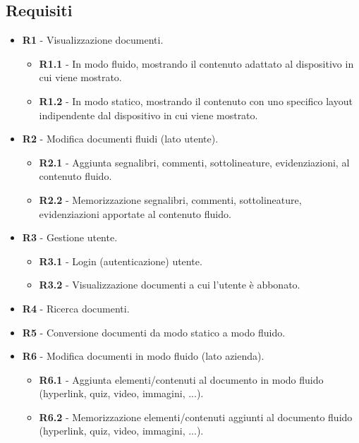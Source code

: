 \subsection{Requisiti}
\begin{itemize}
    \item \textbf{R1} - Visualizzazione documenti.
    \begin{itemize}
        \item \textbf{R1.1} - In modo fluido, mostrando il contenuto adattato al dispositivo in cui viene mostrato.
        \item \textbf{R1.2} - In modo statico, mostrando il contenuto con uno specifico layout indipendente dal dispositivo in cui viene mostrato.
    \end{itemize}
    \item \textbf{R2} - Modifica documenti fluidi (lato utente).
    \begin{itemize}
        \item \textbf{R2.1} - Aggiunta segnalibri, commenti, sottolineature, evidenziazioni, al contenuto fluido.
        \item \textbf{R2.2} - Memorizzazione segnalibri, commenti, sottolineature, evidenziazioni apportate al contenuto fluido.
    \end{itemize}
    \item \textbf{R3} - Gestione utente.
    \begin{itemize}
        \item \textbf{R3.1} - Login (autenticazione) utente.
        \item \textbf{R3.2} - Visualizzazione documenti a cui l'utente è abbonato.
    \end{itemize}
    \item \textbf{R4} - Ricerca documenti.
    \item \textbf{R5} - Conversione documenti da modo statico a modo fluido.
    \item \textbf{R6} - Modifica documenti in modo fluido (lato azienda).
    \begin{itemize}
        \item \textbf{R6.1} - Aggiunta elementi/contenuti al documento in modo fluido (hyperlink, quiz, video, immagini, ...).
        \item \textbf{R6.2} - Memorizzazione elementi/contenuti aggiunti al documento fluido (hyperlink, quiz, video, immagini, ...).
    \end{itemize}
\end{itemize}